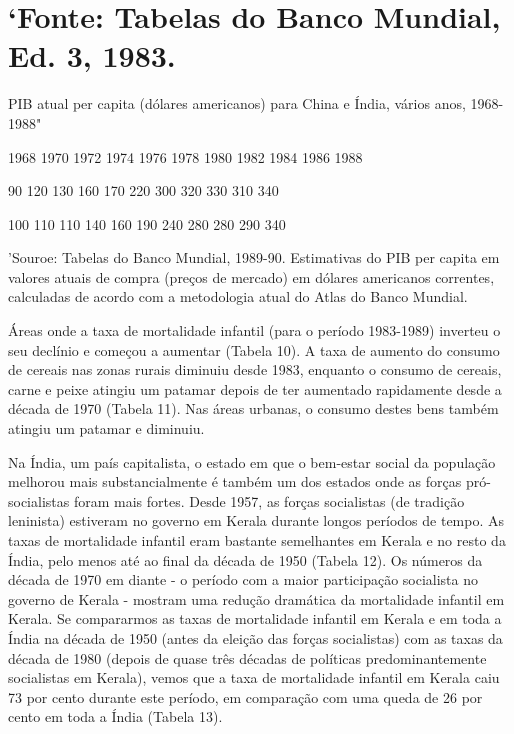 {{{\section{‘Fonte: Tabelas do Banco Mundial, Ed. 3, 1983.}
 \par 
PIB atual per capita (dólares americanos) para China e Índia, vários anos, 1968-1988"
 \par 
1968 1970 1972 1974 1976 1978 1980 1982 1984 1986 1988
 \par 
90 {\color{blue}120} 130 {\color{blue}160} 170 {\color{blue}220} 300 {\color{blue}320} 330 {\color{blue}310} {\color{blue}340}
 \par 
100 {\color{blue}110} 110 {\color{blue}140} 160 {\color{blue}190} 240 {\color{blue}280} 280 {\color{blue}290} {\color{blue}340}
 \par 
'Souroe: Tabelas do Banco Mundial, 1989-90. Estimativas do PIB per capita em valores atuais de compra (preços de mercado) em dólares americanos correntes, calculadas de acordo com a metodologia atual do Atlas do Banco Mundial.
 \par 
Áreas onde a taxa de mortalidade infantil (para o período 1983-1989) inverteu o seu declínio e começou a aumentar (Tabela {\color{blue}10}). A taxa de aumento do consumo de cereais nas zonas rurais diminuiu desde 1983, enquanto o consumo de cereais, carne e peixe atingiu um patamar depois de ter aumentado rapidamente desde a década de 1970 (Tabela {\color{blue}11}). Nas áreas urbanas, o consumo destes bens também atingiu um patamar e diminuiu.
 \par 
Na Índia, um país capitalista, o estado em que o bem-estar social da população melhorou mais substancialmente é também um dos estados onde as forças pró-socialistas foram mais fortes. Desde 1957, as forças socialistas (de tradição leninista) estiveram no governo em Kerala durante longos períodos de tempo. As taxas de mortalidade infantil eram bastante semelhantes em Kerala e no resto da Índia, pelo menos até ao final da década de 1950 (Tabela {\color{blue}12}). Os números da década de 1970 em diante - o período com a maior participação socialista no governo de Kerala - mostram uma redução dramática da mortalidade infantil em Kerala. Se compararmos as taxas de mortalidade infantil em Kerala e em toda a Índia na década de 1950 (antes da eleição das forças socialistas) com as taxas da década de 1980 (depois de quase três décadas de políticas predominantemente socialistas em Kerala), vemos que a taxa de mortalidade infantil em Kerala caiu {\color{blue}73} por cento durante este período, em comparação com uma queda de {\color{blue}26} por cento em toda a Índia (Tabela {\color{blue}13}).
}}}
